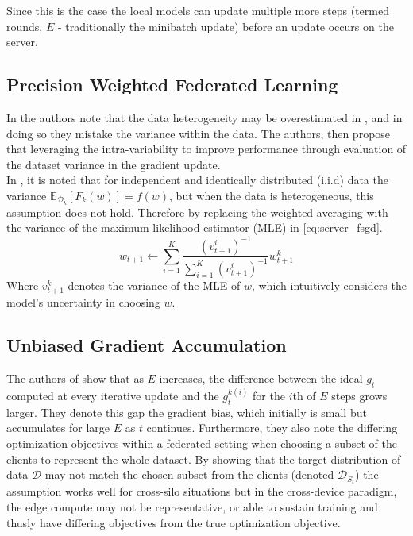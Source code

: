 Since this is the case the local models can update multiple more steps (termed rounds, $E$ - traditionally the minibatch update) before an update occurs on the server.

\subsection{Precision Weighted Federated Learning}
In \cite{reyes2021precision} the authors note that the data heterogeneity may be overestimated in \cite{konevcny2016federated}, and in doing so they mistake the variance within the data. The authors, then propose that leveraging the intra-variability to improve performance through evaluation of the dataset variance in the gradient update. \\

In \cite{konevcny2016federated}, it is noted that for independent and identically distributed (i.i.d) data the variance $\mathbb{E}_{\mathcal{D}_k}[F_k(w)] = f(w)$, but when the data is heterogeneous, this assumption does not hold. Therefore by replacing the weighted averaging with the variance of the maximum likelihood estimator (MLE) in \autoref{eq:server_fsgd}.
\begin{equation}
     w_{t+1} \leftarrow \sum_{i = 1}^{K} \frac{(v_{t+1}^i)^{-1}}{\sum_{i=1}^{K} (v_{t+1}^i)^{-1}}w^k_{t+1} 
\end{equation}
Where $v_{t+1}^k$ denotes the variance of the MLE of $w$, which intuitively considers the model's uncertainty in choosing $w$. 

\subsection{Unbiased Gradient Accumulation}
The authors of \cite{yao2019federated} show that as $E$ increases, the difference between the ideal $g_t$ computed at every iterative update and the $g_t^{k(i)}$ for the $i$th of $E$ steps grows larger. They denote this gap the gradient bias, which initially is small but accumulates for large $E$ as $t$ continues. Furthermore, they also note the differing optimization objectives within a federated setting when choosing a subset of the clients to represent the whole dataset. By showing that the target distribution of data $\mathcal{D}$ may not match the chosen subset from the clients (denoted $\mathcal{D}_{S_t}$) the assumption works well for cross-silo situations but in the cross-device paradigm, the edge compute may not be representative, or able to sustain training and thusly have differing objectives from the true optimization objective.\\

